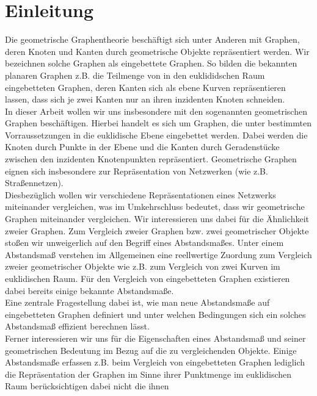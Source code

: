 \documentclass[a4paper, 12pt, twoside]{article}
\theoremstyle{Format1} %
\begin{document}
\newpage
\tableofcontents
\newpage\null\thispagestyle{empty}\newpage %
\section{Einleitung}

Die geometrische Graphentheorie beschäftigt sich unter Anderen mit Graphen, deren Knoten und Kanten durch geometrische Objekte repräsentiert werden.
Wir bezeichnen solche Graphen als eingebettete Graphen. So bilden die bekannten planaren Graphen z.B. die Teilmenge von in den euklididschen Raum eingebetteten Graphen, deren Kanten sich als ebene Kurven repräsentieren lassen, dass
sich je zwei Kanten nur an ihren inzidenten Knoten schneiden.
\\
In dieser Arbeit wollen wir uns insbesondere mit den sogenannten geometrischen Graphen beschäftigen. Hierbei handelt es sich um Graphen, die unter bestimmten Vorraussetzungen in die euklidische Ebene eingebettet werden.
Dabei werden die Knoten durch Punkte in der Ebene und die Kanten durch Geradenstücke zwischen den inzidenten Knotenpunkten repräsentiert.
Geometrische Graphen eignen sich insbesondere zur Repräsentation von Netzwerken (wie z.B. Straßennetzen).
\\
Diesbezüglich wollen wir verschiedene Repräsentationen eines Netzwerks miteinander vergleichen, was im Umkehrschluss bedeutet, dass wir geometrische Graphen miteinander vergleichen.
Wir interessieren uns dabei für die Ähnlichkeit zweier Graphen. Zum Vergleich zweier Graphen bzw. zwei geometrischer Objekte stoßen wir unweigerlich auf den Begriff eines Abstandsmaßes.
Unter einem Abstandsmaß verstehen im Allgemeinen eine reellwertige Zuordung zum Vergleich zweier geometrischer Objekte wie z.B. zum Vergleich von zwei Kurven im euklidischen Raum.
Für den Vergleich von eingebetteten Graphen existieren dabei bereits einige bekannte Abstandsmaße.
\\
Eine zentrale Fragestellung dabei ist, wie man neue Abstandsmaße auf eingebetteten Graphen definiert und unter welchen Bedingungen sich ein solches Abstandsmaß effizient berechnen lässt.
\\
Ferner interessieren wir uns für die Eigenschaften eines Abstandsmaß und seiner geometrischen Bedeutung im Bezug auf die zu vergleichenden Objekte.
Einige Abstandsmaße erfassen z.B. beim Vergleich von eingebetteten Graphen lediglich die Repräsentation der Graphen im Sinne ihrer Punktmenge im euklidischen Raum berücksichtigen dabei nicht die ihnen
\end{document}
